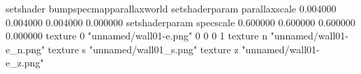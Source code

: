 setshader bumpspecmapparallaxworld
setshaderparam parallaxscale 0.004000 0.004000 0.004000 0.000000
setshaderparam specscale 0.600000 0.600000 0.600000 0.000000
texture 0 "unnamed/wall01-e.png" 0 0 0 1
texture n "unnamed/wall01-e_n.png"
texture s "unnamed/wall01_s.png"
texture z "unnamed/wall01-e_z.png"
